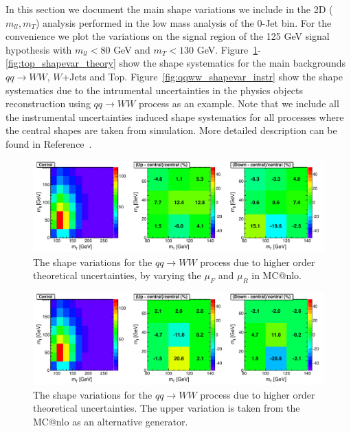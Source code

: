 In this section we document the main shape variations we include in the 
2D ($m_{ll}, m_T$) analysis performed in the low mass analysis of the 0-Jet bin. 
For the convenience we plot the variations on the signal region of the 
125 GeV signal hypothesis with $m_{ll}<80$ GeV and $m_T<130$ GeV. 
Figure~\ref{fig:qqww_shapevar_theory}-\ref{fig:top_shapevar_theory} 
show the shape systematics for the main backgrounds $qq\to WW$, $W$+Jets and Top. 
Figure~\ref{fig:qqww_shapevar_instr} show the shape systematics due to the 
intrumental uncertainties in the physics objects reconstruction using 
$qq\to WW$ process as an example. Note that we include all the instrumental 
uncertainties induced shape systematics for all processes where the central shapes 
are taken from simulation. More detailed description can be found in Reference~\cite{MVASyst}. 

\begin{figure}[!hbtp]
\centering
\includegraphics[width=1.0\textwidth]{figures/qqWW_WWNLOBounding_2D_mH125_0j_of.pdf}
\caption{ The shape variations for the $qq\to WW$ process due to higher order 
theoretical uncertainties, by varying the $\mu_F$ and $\mu_R$ in MC@nlo. }
\label{fig:qqww_shapevar_theory}
\end{figure}

\begin{figure}[!hbtp]
\centering
\includegraphics[width=1.0\textwidth]{figures/qqWW_WWBounding_2D_mH125_0j_of.pdf}
\caption{ The shape variations for the $qq\to WW$ process due to higher order 
theoretical uncertainties. The upper variation is taken from the MC@nlo as an 
alternative generator. }
\label{fig:qqww_shapevar_theory2}
\end{figure}


